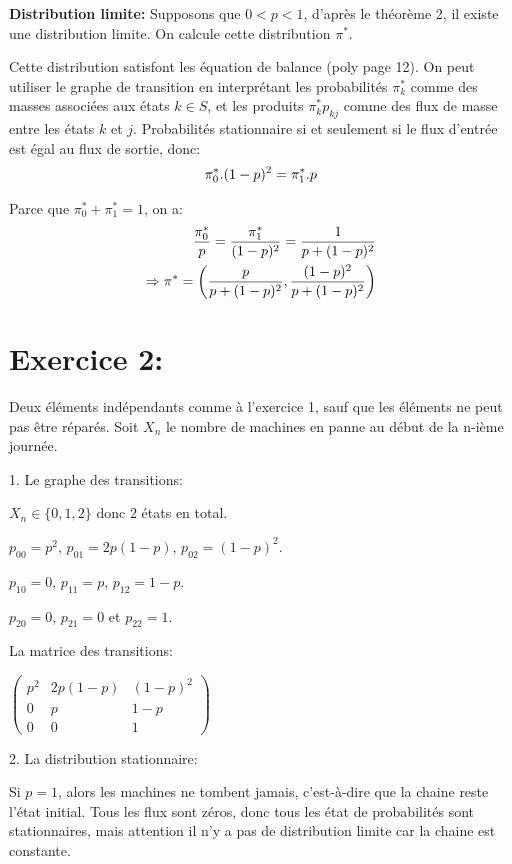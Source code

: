 \documentclass[a4paper,twoside,12pt]{article}
\begin{document}
\textbf{Distribution limite:} Supposons que $0 < p < 1$, d'après le théorème 2, il existe une distribution limite. On calcule cette distribution $\pi^{*}$.

Cette distribution satisfont les équation de balance (poly page 12). On peut utiliser le graphe de transition en interprétant les probabilités $\pi^{*}_k$ comme des masses associées aux états $k \in S$, et les produits $\pi^{*}_kp_{kj}$ comme des flux de masse entre les états $k$ et $j$. Probabilités stationnaire si et seulement si le flux d'entrée est égal au flux de sortie, donc:
\begin{align}
    \pi^{*}_0.(1-p)^2 = \pi^{*}_1.p \notag
\end{align}

Parce que $\pi^{*}_0 + \pi^{*}_1 = 1$, on a:
\begin{align}
    \dfrac{\pi^{*}_0}{p} = \dfrac{\pi^{*}_1}{(1-p)^2} = \dfrac{1}{p+(1-p)^2} \notag \\
    \Rightarrow \pi^{*} = \left(\dfrac{p}{p+(1-p)^2}, \dfrac{(1-p)^2}{p+(1-p)^2}\right)\notag
\end{align}

\section{Exercice 2:}
Deux éléments indépendants comme à l'exercice 1, sauf que les éléments ne peut pas être réparés. Soit $X_n$ le nombre de machines en panne au début de la n-ième journée.

1. Le graphe des transitions:

$X_n \in \{0, 1, 2\}$ donc $2$ états en total.

$p_{00} = p^2$, $p_{01} = 2p(1-p)$, $p_{02} = (1-p)^2$.

$p_{10} = 0$, $p_{11} = p$, $p_{12} = 1-p$.

$p_{20} = 0$, $p_{21} = 0$ et $p_{22} = 1$.

La matrice des transitions:

$\left(\begin{array}{ccc}
    p^2 & 2p(1-p) & (1-p)^2 \\
    0 & p & 1-p \\
    0 & 0 & 1
\end{array}
\right)$

2. La distribution stationnaire:

Si $p=1$, alors les machines ne tombent jamais, c'est-à-dire que la chaine reste l'état initial. Tous les flux sont zéros, donc tous les état de probabilités sont stationnaires, mais attention il n'y a pas de distribution limite car la chaine est constante.
\end{document}
